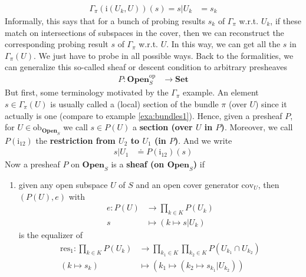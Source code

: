 \begin{exa}
\begin{align*}
  \Gamma_{\pi}(\mathrm{i}(U_{k},U))(s)
  =
  s
  \vert
  U_{k}
  &=
  s_{k}
\end{align*}
Informally, this says that for a bunch of probing results $s_{k}$ of $\Gamma_{\pi}$ w.r.t. $U_{k}$, if these match on intersections of subspaces in the cover, then we can reconstruct the corresponding probing result $s$ of $\Gamma_{\pi}$ w.r.t. $U$.
In this way, we can get all the $s$ in $\Gamma_{\pi}(U)$.
We just have to probe in all possible ways.
Back to the formalities, we can generalize this so-called sheaf or descent condition to arbitrary presheaves
\begin{align*}
  P
  \colon
  \mathbf{Open}_{S}^{\mathrm{op}}
  &\rightarrow
  \mathbf{Set}
\end{align*}
But first, some terminology motivated by the $\Gamma_{\pi}$ example.
An element $s \in \Gamma_{\pi}(U)$ is usually called a (local) section of the bundle $\pi$ (over $U$) since it actually is one (compare to example \ref{exa:bundles1}).
Hence, given a presheaf $P$, for $U \in \mathrm{ob}_{\mathbf{Open}_{S}}$ we call $s \in P(U)$ a \textbf{section (over $U$ in $P$)}.
Moreover, we call $P(\mathrm{i_{12}})$ the \textbf{restriction from $U_{2}$ to $U_{1}$ (in $P$)}.
And we write
\begin{align*}
  s
  \vert
  U_{1}
  &\doteq
  P(\mathrm{i_{12}})(s)
\end{align*}
Now a presheaf $P$ on $\mathbf{Open}_{S}$ is a \textbf{sheaf (on $\mathbf{Open}_{S}$)} if
\begin{enumerate}
\item[(DC)]
given any open subspace $U$ of $S$ and an open cover generator $\mathrm{cov}_{U}$, then $(P(U),e)$ with
\begin{align*}
  e
  \colon
  P(U)
  &\rightarrow
  \prod_{k \in K}
  P(U_{k})
  \\
  s
  &\mapsto
  \left(
    k
    \mapsto
    s
    \vert
    U_{k}
  \right)
\end{align*}
is the equalizer of
\begin{align*}
  \mathrm{res}_{1}
  \colon
  \prod_{k \in K}
  P(U_{k})
  &\rightarrow
  \prod_{k_{1} \in K}
  \prod_{k_{2} \in K}
  P
  \left(
    U_{k_{1}}
    \cap
    U_{k_{2}}
  \right)
  \\
  \left(
    k
    \mapsto
    s_{k}
  \right)
  &\mapsto
  \left(
    k_{1}
    \mapsto
    \left(
      k_{2}
      \mapsto
      s_{k_{1}}
      \vert
      U_{k_{2}}
    \right)
  \right)
  \\\\

\end{align*}
\end{enumerate}
\end{exa}
